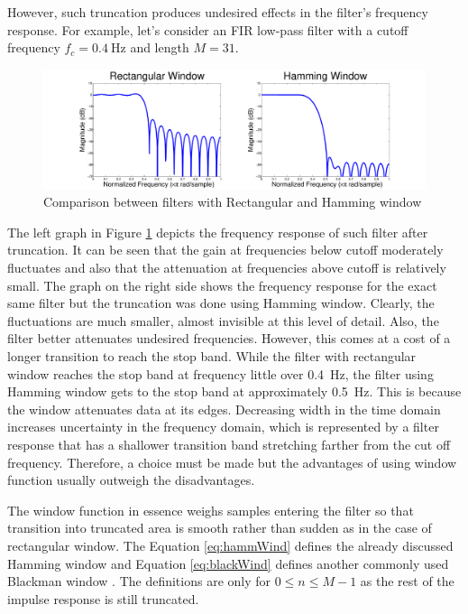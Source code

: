 However, such truncation produces undesired effects in the filter's frequency response. For example, let's consider an FIR low-pass filter with a cutoff frequency $f_c=\SI{0.4}{\Hz}$ and length $M=31$.
\begin{figure}[htb]
	\centering
	\includegraphics[width=1\linewidth]{fig/filterRiples.pdf}
	\caption{Comparison between filters with Rectangular and Hamming window}
	\label{fig:filterRiples}
\end{figure}
The left graph in Figure \ref{fig:filterRiples} depicts the frequency response of such filter after truncation. It can be seen that the gain at frequencies below cutoff moderately fluctuates and also that the attenuation at frequencies above cutoff is relatively small. The graph on the right side shows the frequency response for the exact same filter but the truncation was done using Hamming window. Clearly, the fluctuations are much smaller, almost invisible at this level of detail. Also, the filter better attenuates undesired frequencies. However, this comes at a cost of a longer transition to reach the stop band. While the filter with rectangular window reaches the stop band at frequency little over \SI{0.4}{\Hz}, the filter using Hamming window gets to the stop band at approximately \SI{0.5}{\Hz}. This is because the window attenuates data at its edges. Decreasing width in the time domain increases uncertainty in the frequency domain, which is represented by a filter response that has a shallower transition band stretching farther from the cut off frequency. Therefore, a choice must be made but the advantages of using window function usually outweigh the disadvantages.

The window function in essence weighs samples entering the filter so that transition into truncated area is smooth rather than sudden as in the case of rectangular window. The Equation \ref{eq:hammWind} defines the already discussed Hamming window and Equation \ref{eq:blackWind} defines another commonly used Blackman window \cite[p. 626]{DSP3}. The definitions are only for $0 \leq n \leq M-1$ as the rest of the impulse response is still truncated.

